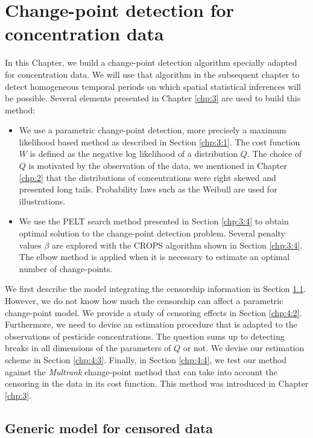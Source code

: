 \chapter{Change-point detection for concentration data}\label{chp:4}

\minitoc

\clearpage

In this Chapter, we build a change-point detection algorithm specially adapted for concentration data. We will use that algorithm in the subsequent chapter to detect homogeneous temporal periods on which spatial statistical inferences will be possible. Several elements presented in Chapter \ref{chp:3} are used to build this method:  
\begin{itemize}
\item We use a parametric change-point detection, more precisely a maximum likelihood based method as described in Section \ref{chp:3:1}. The cost function $W$ is defined as the negative log likelihood of a distribution $Q$. The choice of $Q$ is motivated by the observation of the data, we mentioned in Chapter \ref{chp:2} that the distributions of concentrations were right skewed and presented long tails. Probability laws such as the Weibull are used for illustrations.  
\item We use the PELT search method presented in Section \ref{chp:3:4} to obtain optimal solution to the change-point detection problem. Several penalty values $\beta$ are explored with the CROPS algorithm shown in Section \ref{chp:3:4}. The elbow method is applied when it is necessary to estimate an optimal number of change-points.   
\end{itemize}
We first describe the model integrating the censorship information in Section \ref{chp:4:1}. However, we do not know how much the censorship can affect a parametric change-point model. We provide a study of censoring effects in Section \ref{chp:4:2}. Furthermore, we need to devise an estimation procedure that is adapted to the observations of pesticide concentrations. The question sums up to detecting breaks in all dimensions of the parameters of $Q$ or not. We devise our estimation scheme in Section \ref{chp:4:3}. Finally, in Section \ref{chp:4:4}, we test our method against the \textit{Multrank} change-point method that can take into account the censoring in the data in its cost function. This method was introduced in Chapter \ref{chp:3}. 


\section{Generic model for censored data}\label{chp:4:1}

